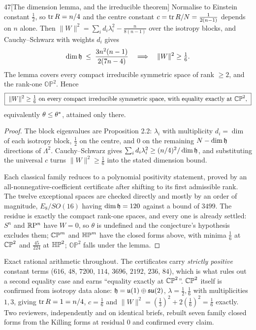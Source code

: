 \begin{Lem}{47}[The dimension lemma, and the irreducible theorem]
Normalise to Einstein constant $\tfrac12$, so $\operatorname{tr} R=n/4$ and the centre constant $c=\operatorname{tr} R/N=\tfrac1{2(n-1)}$ depends on $n$ alone. Then $\|W\|^2=\sum_id_i\lambda_i^2-\tfrac n{8(n-1)}$ over the isotropy blocks, and Cauchy--Schwarz with weights $d_i$ gives
\[
\dim\mathfrak{h}\;\le\;\frac{3n^2(n-1)}{2(7n-4)}\quad\Longrightarrow\quad\|W\|^2\ge\tfrac16 .
\]
The lemma covers every compact irreducible symmetric space of rank $\ge2$, and the rank-one $\mathbb{OP}^2$. Hence
\[
\boxed{\ \|W\|^2\ge\tfrac16\ \text{on every compact irreducible symmetric space, with equality exactly at }\mathbb{CP}^2,\ }
\]
equivalently $\theta\le\theta^{*}$, attained only there.
\end{Lem}

\begin{proof}
The block eigenvalues are \cite{ps2025} Proposition 2.2: $\lambda_i$ with multiplicity $d_i=\dim$ of each isotropy block, $\tfrac12$ on the centre, and $0$ on the remaining $N-\dim\mathfrak{h}$ directions of $\Lambda^2$. Cauchy--Schwarz gives $\sum_id_i\lambda_i^2\ge(n/4)^2/\dim\mathfrak{h}$, and substituting the universal $c$ turns $\|W\|^2\ge\tfrac16$ into the stated dimension bound.

Each classical family reduces to a polynomial positivity statement, proved by an all-nonnegative-coefficient certificate after shifting to its first admissible rank. The twelve exceptional spaces are checked directly and mostly by an order of magnitude, $E_8/SO(16)$ having $\dim\mathfrak{h}=120$ against a bound of $3499$. The residue is exactly the compact rank-one spaces, and every one is already settled: $S^n$ and $\mathbb{R}\mathrm P^n$ have $W=0$, so $\theta$ is undefined and the conjecture's hypothesis excludes them; $\mathbb{CP}^m$ and $\mathbb{HP}^m$ have the closed forms above, with minima $\tfrac16$ at $\mathbb{CP}^2$ and $\tfrac{45}{224}$ at $\mathbb{HP}^2$; $\mathbb{OP}^2$ falls under the lemma.
\end{proof}

\begin{certificate}
Exact rational arithmetic throughout. The certificates carry \emph{strictly positive} constant terms ($616$, $48$, $7200$, $114$, $3696$, $2192$, $236$, $84$), which is what rules out a second equality case and earns ``equality exactly at $\mathbb{CP}^2$''. $\mathbb{CP}^2$ itself is confirmed from isotropy data alone: $\mathfrak{h}=\mathfrak{u}(1)\oplus\mathfrak{su}(2)$, $\lambda=\tfrac12,\tfrac16$ with multiplicities $1,3$, giving $\operatorname{tr} R=1=n/4$, $c=\tfrac16$ and $\|W\|^2=(\tfrac13)^2+2(\tfrac16)^2=\tfrac16$ exactly. Two reviewers, independently and on identical briefs, rebuilt seven family closed forms from the Killing forms at residual $0$ and confirmed every claim.
\end{certificate}

